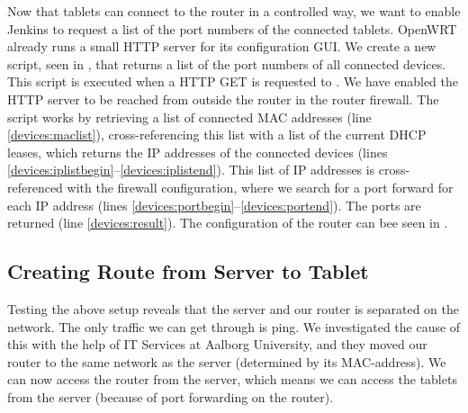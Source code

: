 

Now that tablets can connect to the router in a controlled way, we want to enable Jenkins to request a list of the port numbers of the connected tablets. OpenWRT already runs a small HTTP server for its configuration GUI\@. We create a new script, seen in , that returns a list of the port numbers of all connected devices. This script is executed when a HTTP GET is requested to . We have enabled the HTTP server to be reached from outside the router in the router firewall. The script works by retrieving a list of connected MAC addresses (line \ref{devices:maclist}), cross-referencing this list with a list of the current DHCP leases, which returns the IP addresses of the connected devices (lines \ref{devices:iplistbegin}--\ref{devices:iplistend}). This list of IP addresses is cross-referenced with the firewall configuration, where we search for a port forward for each IP address (lines \ref{devices:portbegin}--\ref{devices:portend}). The ports are returned (line \ref{devices:result}). The configuration of the router can bee seen in .



\subsection{Creating Route from Server to Tablet}\label{sec:router_server_tablet}
Testing the above setup reveals that the server and our router is separated on the network. The only traffic we can get through is ping. We investigated the cause of this with the help of IT Services at Aalborg University, and they moved our router to the same network as the server (determined by its MAC-address). We can now access the router from the server, which means we can access the tablets from the server (because of port forwarding on the router).

